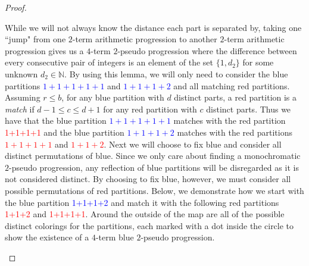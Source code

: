 \documentclass[ fontsize=10pt,twoside]{scrartcl}
\begin{document}
\begin{proof}
\begin{center}
\end{center}

While we will not always know the distance each part is separated by, taking one ``jump" from one $2$-term arithmetic progression to another $2$-term arithmetic progression gives us a $4$-term $2$-pseudo progression where the difference between every consecutive pair of integers is an element of the set $\{1,d_2\}$ for some unknown $d_2 \in \mathbb{N}$. By using this lemma, we will only need to consider the blue partitions \textcolor{blue}{$1+1+1+1+1$} and \textcolor{blue}{$1+1+1+2$} and all matching red partitions. Assuming $r\leq b$, for any blue partition with $d$ distinct parts, a red partition is a \emph{match} if $d-1 \leq c \leq d+1$ for any red partition with $c$ distinct parts. Thus we have that the blue partition \textcolor{blue}{$1+1+1+1+1$} matches with the red partition \textcolor{red}{1+1+1+1} and the blue partition \textcolor{blue}{$1+1+1+2$} matches with the red partitions \textcolor{red}{$1+1+1+1$} and \textcolor{red}{$1+1+2$}. Next we will choose to fix blue and consider all distinct permutations of blue. Since we only care about finding a monochromatic $2$-pseudo progression, any reflection of blue partitions will be disregarded as it is not considered distinct. By choosing to fix blue, however, we must consider all possible permutations of red partitions. Below, we demonstrate how we start with the blue partition \textcolor{blue}{1+1+1+2} and match it with the following red partitions \textcolor{red}{1+1+2} and \textcolor{red}{1+1+1+1}. Around the outside of the map are all of the possible distinct colorings for the partitions, each marked with a dot inside the circle to show the existence of a $4$-term blue $2$-pseudo progression.
\begin{center}
\end{center}
\end{proof}
\end{document}
